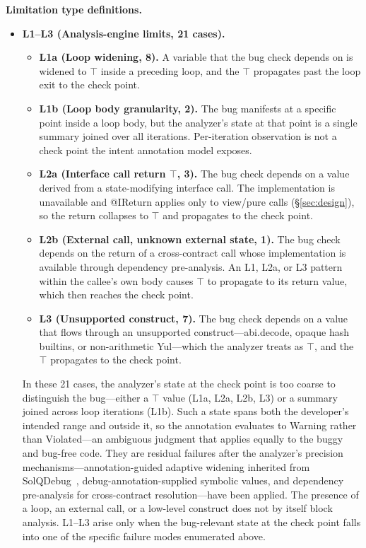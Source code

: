 \documentclass[pdflatex,sn-basic]{sn-jnl}%
\theoremstyle{thmstyleone}%
\theoremstyle{thmstyletwo}%
\theoremstyle{thmstylethree}%
\begin{document}
\smallskip
\noindent\textbf{Limitation type definitions.}
\begin{itemize}
  \item \textbf{L1--L3 (Analysis-engine limits, 21 cases).}
  \begin{itemize}
    \item \textbf{L1a (Loop widening, 8).} A variable that the bug check depends on is widened to $\top$ inside a preceding loop, and the $\top$ propagates past the loop exit to the check point.
    \item \textbf{L1b (Loop body granularity, 2).} The bug manifests at a specific point inside a loop body, but the analyzer's state at that point is a single summary joined over all iterations. Per-iteration observation is not a check point the intent annotation model exposes.
    \item \textbf{L2a (Interface call return $\top$, 3).} The bug check depends on a value derived from a state-modifying interface call. The implementation is unavailable and @IReturn applies only to view/pure calls (§\ref{sec:design}), so the return collapses to $\top$ and propagates to the check point.
    \item \textbf{L2b (External call, unknown external state, 1).} The bug check depends on the return of a cross-contract call whose implementation is available through dependency pre-analysis. An L1, L2a, or L3 pattern within the callee's own body causes $\top$ to propagate to its return value, which then reaches the check point.
    \item \textbf{L3 (Unsupported construct, 7).} The bug check depends on a value that flows through an unsupported construct---abi.decode, opaque hash builtins, or non-arithmetic Yul---which the analyzer treats as $\top$, and the $\top$ propagates to the check point.
  \end{itemize}
  \noindent In these 21 cases, the analyzer's state at the check point is too coarse to distinguish the bug---either a $\top$ value (L1a, L2a, L2b, L3) or a summary joined across loop iterations (L1b). Such a state spans both the developer's intended range and outside it, so the annotation evaluates to Warning rather than Violated---an ambiguous judgment that applies equally to the buggy and bug-free code. They are residual failures after the analyzer's precision mechanisms---annotation-guided adaptive widening inherited from SolQDebug~\citep{solqdebug}, debug-annotation-supplied symbolic values, and dependency pre-analysis for cross-contract resolution---have been applied. The presence of a loop, an external call, or a low-level construct does not by itself block analysis. L1--L3 arise only when the bug-relevant state at the check point falls into one of the specific failure modes enumerated above.


\end{itemize}
\end{document}
